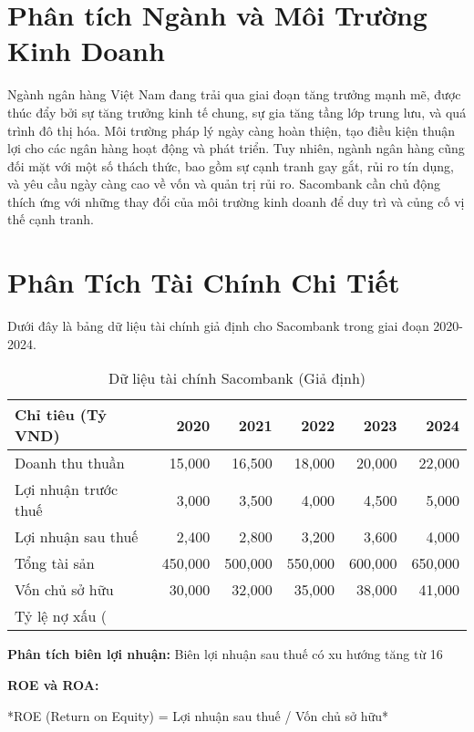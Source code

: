 \documentclass[12pt]{article}
\begin{document}
\section{Phân tích Ngành và Môi Trường Kinh Doanh}

Ngành ngân hàng Việt Nam đang trải qua giai đoạn tăng trưởng mạnh mẽ, được thúc đẩy bởi sự tăng trưởng kinh tế chung, sự gia tăng tầng lớp trung lưu, và quá trình đô thị hóa.  Môi trường pháp lý ngày càng hoàn thiện, tạo điều kiện thuận lợi cho các ngân hàng hoạt động và phát triển. Tuy nhiên, ngành ngân hàng cũng đối mặt với một số thách thức, bao gồm sự cạnh tranh gay gắt, rủi ro tín dụng, và yêu cầu ngày càng cao về vốn và quản trị rủi ro. Sacombank cần chủ động thích ứng với những thay đổi của môi trường kinh doanh để duy trì và củng cố vị thế cạnh tranh.

\section{Phân Tích Tài Chính Chi Tiết}

Dưới đây là bảng dữ liệu tài chính giả định cho Sacombank trong giai đoạn 2020-2024.

\begin{table}[h!]
\centering
\begin{tabular}{lrrrrr}
\toprule
Chỉ tiêu (Tỷ VND) & 2020 & 2021 & 2022 & 2023 & 2024 \\
\midrule
Doanh thu thuần & 15,000 & 16,500 & 18,000 & 20,000 & 22,000 \\
Lợi nhuận trước thuế & 3,000 & 3,500 & 4,000 & 4,500 & 5,000 \\
Lợi nhuận sau thuế & 2,400 & 2,800 & 3,200 & 3,600 & 4,000 \\
Tổng tài sản & 450,000 & 500,000 & 550,000 & 600,000 & 650,000 \\
Vốn chủ sở hữu & 30,000 & 32,000 & 35,000 & 38,000 & 41,000 \\
\midrule
Tỷ lệ nợ xấu (%
\bottomrule
\end{tabular}
\caption{Dữ liệu tài chính Sacombank (Giả định)}
\label{tab:financial_data}
\end{table}

\textbf{Phân tích biên lợi nhuận:} Biên lợi nhuận sau thuế có xu hướng tăng từ 16%

\textbf{ROE và ROA:}

*ROE (Return on Equity) = Lợi nhuận sau thuế / Vốn chủ sở hữu*
\end{document}
